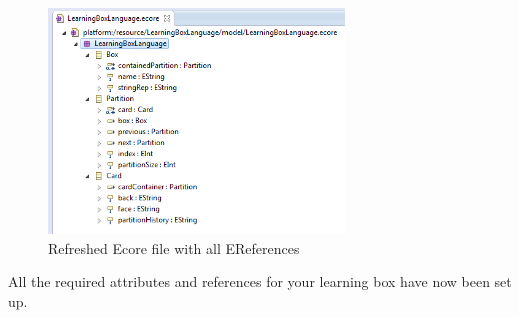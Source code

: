 \begin{stepbystep}
\vspace{1cm}

\begin{figure}[htbp]
	\centering
  \includegraphics[width=0.7\textwidth]{../../org.moflon.doc.handbook.02_leitnersLearningBox/2_staticSemantics/2_definingClasses/dcVisImages/eclipse_modelDeclaredClasses}
	\caption{Refreshed Ecore file with all EReferences}
	\label{eclipse:model_allClasses}
\end{figure}

\vspace{1cm}

\item All the required attributes and references for your learning box have now been set up.


\end{stepbystep}
